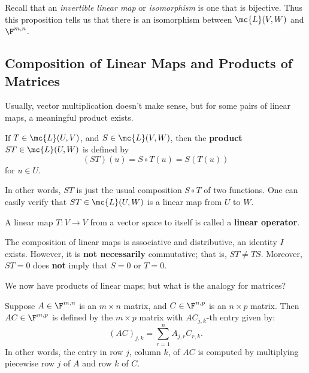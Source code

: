 \documentclass[math0540-lecture-notes.tex]{subfiles}
\begin{document}
\begin{remark}
  Recall that an \textit{invertible linear map} or \textit{isomorphism} is one that is bijective.
  Thus this proposition tells us that there is an isomorphism between $\mc{L}(V,W)$ and $\F^{m,n}$.
\end{remark}

\subsection{Composition of Linear Maps and Products of Matrices}

Usually, vector multiplication doesn't make sense, but for some pairs of linear maps, a meaningful
product exists.
\begin{definition}{}
  If $T\in \mc{L}(U,V)$, and $S\in \mc{L}(V,W)$, then the \textbf{product} $ST\in \mc{L}(U,W)$ is
  defined by \[
    (ST)(u)=S\circ T(u)=S(T(u))
  \] for $u\in U.$
\end{definition}
In other words, $ST$ is just the usual composition $S\circ T$ of two functions. One can easily
verify that $ST\in \mc{L}(U,W)$ is a linear map from $U$ to $W$.

\begin{definition}{}
  A linear map $T:V\to V$ from a vector space to itself is called a \textbf{linear operator}.
\end{definition}
\begin{proposition}[]{}
  The composition of linear maps is associative and distributive, an identity $I$ exists. However,
  it is \textbf{not necessarily} commutative; that is, $ST\neq TS$. Moreover, $ST=0$ does
  \textbf{not} imply that $S=0$ or $T=0$.
\end{proposition}

We now have products of linear maps; but what is the analogy for matrices?

\begin{definition}{}
  Suppose $A\in \F^{m,n}$ is an $m\times n$ matrix, and $C\in \F^{n,p}$ is an $n\times p$ matrix.
  Then $AC\in \F^{m,p}$ is defined by the $m\times p$ matrix with $AC_{j,k}$-th entry given by:  \[
    (AC)_{j,k}=\sum_{r=1}^{n} A_{j,r}C_{r,k}
  .\] In other words, the entry in row $j$, column $k$, of $AC$ is computed by multiplying piecewise
  row $j$ of $A$ and row $k$ of $C$.
\end{definition}
\end{document}
